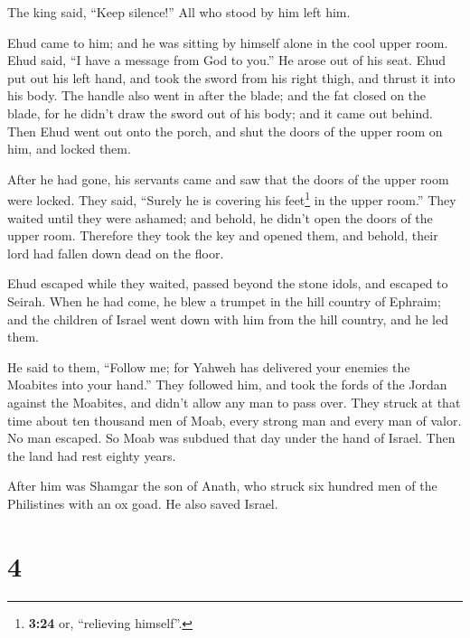 The king said, ``Keep silence!'' All who stood by him left him.

 Ehud came to him; and he was sitting by himself alone in
the cool upper room. Ehud said, ``I have a message from God to you.'' He
arose out of his seat.  Ehud put out his left hand, and
took the sword from his right thigh, and thrust it into his body.
 The handle also went in after the blade; and the fat
closed on the blade, for he didn't draw the sword out of his body; and
it came out behind.  Then Ehud went out onto the porch,
and shut the doors of the upper room on him, and locked them.

 After he had gone, his servants came and saw that the
doors of the upper room were locked. They said, ``Surely he is covering
his feet\footnote{\textbf{3:24} or, ``relieving himself''.} in the upper
room.''  They waited until they were ashamed; and behold,
he didn't open the doors of the upper room. Therefore they took the key
and opened them, and behold, their lord had fallen down dead on the
floor.

 Ehud escaped while they waited, passed beyond the stone
idols, and escaped to Seirah.  When he had come, he blew
a trumpet in the hill country of Ephraim; and the children of Israel
went down with him from the hill country, and he led them.

 He said to them, ``Follow me; for Yahweh has delivered
your enemies the Moabites into your hand.'' They followed him, and took
the fords of the Jordan against the Moabites, and didn't allow any man
to pass over.  They struck at that time about ten
thousand men of Moab, every strong man and every man of valor. No man
escaped.  So Moab was subdued that day under the hand of
Israel. Then the land had rest eighty years.

 After him was Shamgar the son of Anath, who struck six
hundred men of the Philistines with an ox goad. He also saved Israel.

\hypertarget{section-3}{%
\section{4}\label{section-3}}

